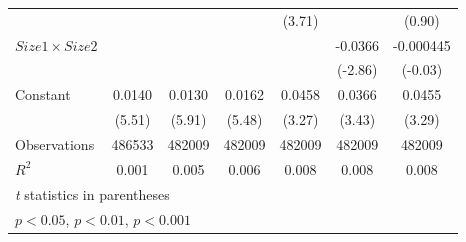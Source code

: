 {\begin{tabular}{l*{6}{c}}
                    &                     &                     &                     &      (3.71)         &                     &      (0.90)         \\
[1em]
$ Size1 \times Size2 $&                     &                     &                     &                     &     -0.0366\sym{**} &   -0.000445         \\
                    &                     &                     &                     &                     &     (-2.86)         &     (-0.03)         \\
[1em]
Constant            &      0.0140\sym{***}&      0.0130\sym{***}&      0.0162\sym{***}&      0.0458\sym{**} &      0.0366\sym{**} &      0.0455\sym{**} \\
                    &      (5.51)         &      (5.91)         &      (5.48)         &      (3.27)         &      (3.43)         &      (3.29)         \\
\hline
Observations        &      486533         &      482009         &      482009         &      482009         &      482009         &      482009         \\
\(R^{2}\)           &       0.001         &       0.005         &       0.006         &       0.008         &       0.008         &       0.008         \\
\hline\hline
\multicolumn{7}{l}{\footnotesize \textit{t} statistics in parentheses}\\
\multicolumn{7}{l}{\footnotesize \sym{*} \(p<0.05\), \sym{**} \(p<0.01\), \sym{***} \(p<0.001\)}\\
\end{tabular}
}
